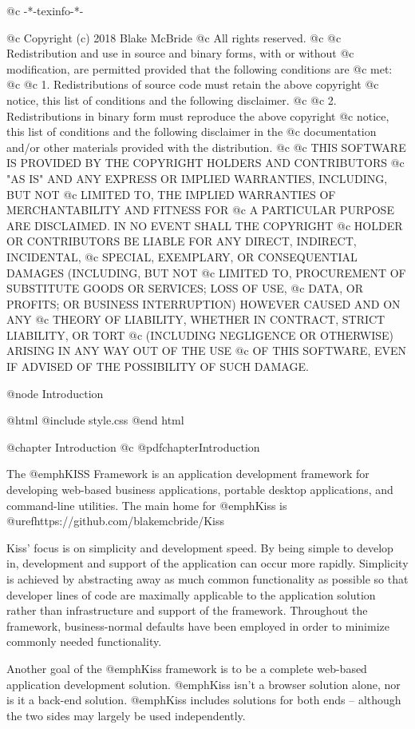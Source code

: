 @c -*-texinfo-*-

@c  Copyright (c) 2018 Blake McBride
@c  All rights reserved.
@c
@c  Redistribution and use in source and binary forms, with or without
@c  modification, are permitted provided that the following conditions are
@c  met:
@c
@c  1. Redistributions of source code must retain the above copyright
@c  notice, this list of conditions and the following disclaimer.
@c
@c  2. Redistributions in binary form must reproduce the above copyright
@c  notice, this list of conditions and the following disclaimer in the
@c  documentation and/or other materials provided with the distribution.
@c
@c  THIS SOFTWARE IS PROVIDED BY THE COPYRIGHT HOLDERS AND CONTRIBUTORS
@c  "AS IS" AND ANY EXPRESS OR IMPLIED WARRANTIES, INCLUDING, BUT NOT
@c  LIMITED TO, THE IMPLIED WARRANTIES OF MERCHANTABILITY AND FITNESS FOR
@c  A PARTICULAR PURPOSE ARE DISCLAIMED. IN NO EVENT SHALL THE COPYRIGHT
@c  HOLDER OR CONTRIBUTORS BE LIABLE FOR ANY DIRECT, INDIRECT, INCIDENTAL,
@c  SPECIAL, EXEMPLARY, OR CONSEQUENTIAL DAMAGES (INCLUDING, BUT NOT
@c  LIMITED TO, PROCUREMENT OF SUBSTITUTE GOODS OR SERVICES; LOSS OF USE,
@c  DATA, OR PROFITS; OR BUSINESS INTERRUPTION) HOWEVER CAUSED AND ON ANY
@c  THEORY OF LIABILITY, WHETHER IN CONTRACT, STRICT LIABILITY, OR TORT
@c  (INCLUDING NEGLIGENCE OR OTHERWISE) ARISING IN ANY WAY OUT OF THE USE
@c  OF THIS SOFTWARE, EVEN IF ADVISED OF THE POSSIBILITY OF SUCH DAMAGE.



@node Introduction

@html
@include style.css
@end html

@chapter Introduction
@c @pdfchapter{Introduction}

The @emph{KISS Framework} is an application development framework for
developing web-based business applications, portable desktop
applications, and command-line utilities.  The main home for
@emph{Kiss} is @uref{https://github.com/blakemcbride/Kiss}


Kiss' focus is on simplicity and development speed.  By being simple
to develop in, development and support of the application can occur
more rapidly.  Simplicity is achieved by abstracting away as much
common functionality as possible so that developer lines of code are
maximally applicable to the application solution rather than
infrastructure and support of the framework.  Throughout the
framework, business-normal defaults have been employed in order to
minimize commonly needed functionality.

Another goal of the @emph{Kiss} framework is to be a complete web-based
application development solution.  @emph{Kiss} isn't a browser solution
alone, nor is it a back-end solution.  @emph{Kiss} includes solutions for
both ends -- although the two sides may largely be used independently.

